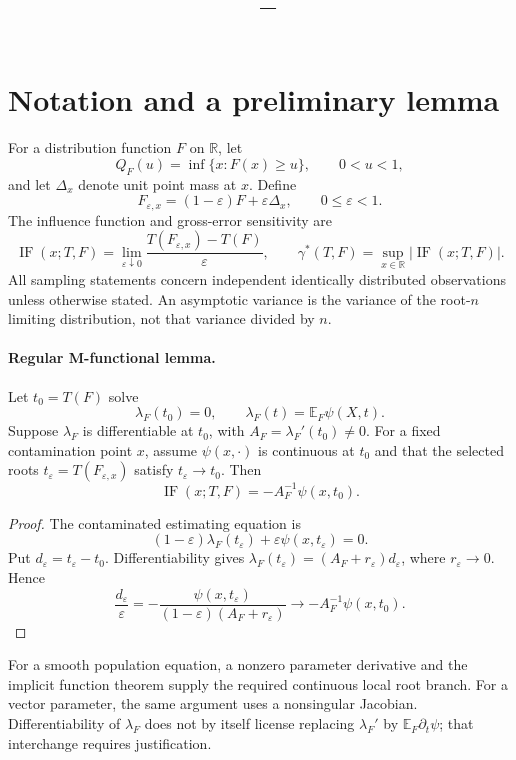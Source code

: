 \documentclass[answers,12pt,addpoints]{exam}
\author{\name}
\title{\course\ -- \assignment}
\date{}
\providecommand{\E}{\mathbb{E}}
\providecommand{\R}{\mathbb{R}}
\providecommand{\IF}{\operatorname{IF}}
\providecommand{\GES}{\gamma^*}
\begin{document}
\maketitle

\section*{Notation and a preliminary lemma}
For a distribution function $F$ on $\R$, let
\[
Q_F(u)=\inf\{x:F(x)\geq u\},\qquad 0<u<1,
\]
and let $\Delta_x$ denote unit point mass at $x$. Define
\[
F_{\varepsilon,x}=(1-\varepsilon)F+\varepsilon\Delta_x,
\qquad 0\leq\varepsilon<1.
\]
The influence function and gross-error sensitivity are
\[
\IF(x;T,F)=\lim_{\varepsilon\downarrow0}
\frac{T(F_{\varepsilon,x})-T(F)}{\varepsilon},
\qquad
\GES(T,F)=\sup_{x\in\R}|\IF(x;T,F)|.
\]
All sampling statements concern independent identically distributed
observations unless otherwise stated. An asymptotic variance is the
variance of the root-$n$ limiting distribution, not that variance
divided by $n$.

\paragraph{Regular M-functional lemma.}
Let $t_0=T(F)$ solve
\[
\lambda_F(t_0)=0,\qquad \lambda_F(t)=\E_F\psi(X,t).
\]
Suppose $\lambda_F$ is differentiable at $t_0$, with
$A_F=\lambda_F'(t_0)\ne0$. For a fixed contamination point $x$, assume
$\psi(x,\cdot)$ is continuous at $t_0$ and that the selected roots
$t_\varepsilon=T(F_{\varepsilon,x})$ satisfy $t_\varepsilon\to t_0$.
Then
\[
\IF(x;T,F)=-A_F^{-1}\psi(x,t_0).
\]
\begin{proof}
The contaminated estimating equation is
\[
(1-\varepsilon)\lambda_F(t_\varepsilon)
+\varepsilon\psi(x,t_\varepsilon)=0.
\]
Put $d_\varepsilon=t_\varepsilon-t_0$. Differentiability gives
$\lambda_F(t_\varepsilon)=(A_F+r_\varepsilon)d_\varepsilon$, where
$r_\varepsilon\to0$. Hence
\[
\frac{d_\varepsilon}{\varepsilon}
=-\frac{\psi(x,t_\varepsilon)}
{(1-\varepsilon)(A_F+r_\varepsilon)}
\longrightarrow -A_F^{-1}\psi(x,t_0).
\]
\end{proof}
For a smooth population equation, a nonzero parameter derivative
and the implicit function theorem supply the required continuous
local root branch. For a vector parameter, the same argument uses a
nonsingular Jacobian. Differentiability of $\lambda_F$ does not by
itself license replacing $\lambda_F'$ by $\E_F\partial_t\psi$;
that interchange requires justification.
\end{document}

